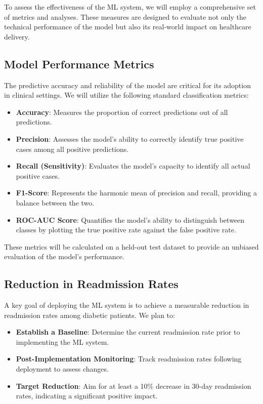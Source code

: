 \documentclass{article}
\begin{document}
To assess the effectiveness of the ML system, we will employ a comprehensive set of metrics and analyses. These measures are designed to evaluate not only the technical performance of the model but also its real-world impact on healthcare delivery.

\subsection{Model Performance Metrics}

The predictive accuracy and reliability of the model are critical for its adoption in clinical settings. We will utilize the following standard classification metrics:

\begin{itemize}[leftmargin=*]
    \item \textbf{Accuracy}: Measures the proportion of correct predictions out of all predictions.
    \item \textbf{Precision}: Assesses the model's ability to correctly identify true positive cases among all positive predictions.
    \item \textbf{Recall (Sensitivity)}: Evaluates the model's capacity to identify all actual positive cases.
    \item \textbf{F1-Score}: Represents the harmonic mean of precision and recall, providing a balance between the two.
    \item \textbf{ROC-AUC Score}: Quantifies the model's ability to distinguish between classes by plotting the true positive rate against the false positive rate.
\end{itemize}

These metrics will be calculated on a held-out test dataset to provide an unbiased evaluation of the model's performance.

\subsection{Reduction in Readmission Rates}

A key goal of deploying the ML system is to achieve a measurable reduction in readmission rates among diabetic patients. We plan to:

\begin{itemize}[leftmargin=*]
    \item \textbf{Establish a Baseline}: Determine the current readmission rate prior to implementing the ML system.
    \item \textbf{Post-Implementation Monitoring}: Track readmission rates following deployment to assess changes.
    \item \textbf{Target Reduction}: Aim for at least a 10\% decrease in 30-day readmission rates, indicating a significant positive impact.
\end{itemize}
\end{document}
